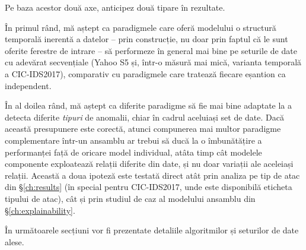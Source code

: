 Pe baza acestor două axe, anticipez două tipare în rezultate.

În primul rând, mă aștept ca paradigmele care oferă modelului o structură temporală inerentă a datelor -- prin construcție, nu doar prin faptul că le sunt oferite ferestre de intrare -- să performeze în general mai bine pe seturile de date cu adevărat secvențiale (Yahoo S5 și, într-o măsură mai mică, varianta temporală a CIC-IDS2017), comparativ cu paradigmele care tratează fiecare eșantion ca independent.

În al doilea rând, mă aștept ca diferite paradigme să fie mai bine adaptate la a detecta diferite \emph{tipuri} de anomalii, chiar în cadrul aceluiași set de date. Dacă această presupunere este corectă, atunci compunerea mai multor paradigme complementare într-un ansamblu ar trebui să ducă la o îmbunătățire a performanței față de oricare model individual, atâta timp cât modelele componente exploatează relații diferite din date, și nu doar variații ale aceleiași relații. Această a doua ipoteză este testată direct atât prin analiza pe tip de atac din \S\ref{ch:results} (în special pentru CIC-IDS2017, unde este disponibilă eticheta tipului de atac), cât și prin studiul de caz al modelului ansamblu din \S\ref{ch:explainability}.

În următoarele secțiuni vor fi prezentate detaliile algoritmilor și seturilor de date alese.



